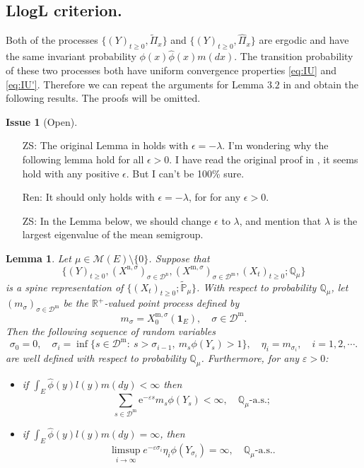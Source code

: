 \documentclass[12pt,a4paper]{amsart}
\numberwithin{equation}{section}
\theoremstyle{plain}
\newtheorem{lem}[thm]{Lemma}
\theoremstyle{definition}
\newtheorem{iss}{Issue}
\begin{document}
\subsection{LlogL criterion.}

Both of the processes $\{(Y)_{t\geq 0}, \widetilde\Pi_x\}$ and $\{(Y)_{t\geq 0}, \widehat{\Pi}_x\}$ are ergodic and have the same invariant probability $\phi(x)\widehat\phi(x)m(dx)$.
The transition probability of these two processes both have uniform convergence properties \eqref{eq:IU} and \eqref{eq:IU'}.
Therefore we can repeat the arguments for Lemma $3.2$ in \cite{LiuRenSong2009Log} and obtain the following results.
The proofs will be omitted.

\begin{iss}[Open]~
  \begin{itemize}
  \item[ZS:]
The original Lemma in \cite{LiuRenSong2009Log} holds with $\epsilon = -\lambda$. I'm wondering why the following lemma hold for all $\epsilon>0$. I have read the original proof in \cite{LiuRenSong2009Log}, it seems hold with any positive $\epsilon$. But I can't be 100\% sure. 

\item[Ren:] 
It should only holds with $\epsilon = -\lambda$, for for any $\epsilon>0.$

\item[ZS:]
 In the Lemma below, we should change $\epsilon$ to $\lambda$, and mention that $\lambda$ is the largest eigenvalue of the mean semigroup.
  \end{itemize}
\end{iss}
\begin{lem}\label{lem:import_lemma}
	Let $\mu \in \mathcal M(E)\setminus \{0\}$.
	Suppose that \[\{(Y)_{t\geq 0}, (X^{\mathrm n, \sigma})_{\sigma\in \mathcal D^\mathrm n}, (X^{\mathrm m, \sigma})_{\sigma \in \mathcal D^\mathrm m}, (X_t)_{t\geq 0}; \mathbb Q_{\mu}\}\] is a spine representation of $\{(X_t)_{t\geq 0}; \widetilde {\mathbb P}_\mu\}$.
	With respect to probability $\mathbb Q_\mu$, let $(m_\sigma)_{\sigma\in \mathcal D^{\mathrm m}}$ be the $\mathbb R^+$-valued point process defined by
  \[
  	m_\sigma = X^{\mathrm m, \sigma}_0(\mathbf 1_E),
  	\quad \sigma \in \mathcal D^{\mathrm m}.
  \]
	Then the following sequence of random variables
  \[
    \sigma_0=0,\quad \sigma_i=\inf\{s\in\mathcal D^{\mathrm m}:\ s>\sigma_{i-1},\ m_s\phi(Y_s)>1\}, \quad\eta_i=m_{\sigma_i},\quad i=1,2,\cdots.
  \]
	are well defined with respect to probability $\mathbb Q_\mu$.
	Furthermore, for any $\varepsilon>0$:
  \begin{itemize}
  \item
    if $\int_E\widehat{\phi}(y)l(y)m(dy)<\infty$ then
  \[
    \sum_{s\in\mathcal D^{\mathrm m}}\mbox{e}^{-\varepsilon s}m_s\phi(Y_s) < \infty, \quad
    \mathbb Q_{\mu}\text{-a.s.};
  \]
\item
  if $ \int_E\widehat{\phi}(y)l(y)m(dy)=\infty$, then
  \[
    \limsup_{i\rightarrow\infty}e^{-\varepsilon \sigma_i}\eta_i
    \phi(Y_{\sigma_i})=\infty,
    \quad \mathbb Q_{\mu}\text{-a.s.}.
  \]
\end{itemize}
\end{lem}
\end{document}
